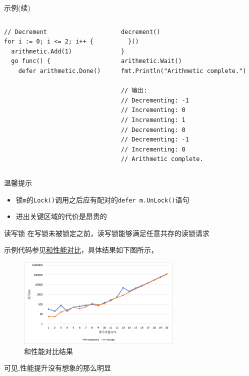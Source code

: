 \begin{frame}[fragile]{示例(续)}
    \begin{columns}[t]
        \begin{column}{0.5\textwidth}
\begin{lstlisting}[caption={\Mutex 使用示例(续)},firstnumber=last,xleftmargin=8pt]
// Decrement
for i := 0; i <= 2; i++ {
  arithmetic.Add(1)
  go func() {
    defer arithmetic.Done()
\end{lstlisting}
        \end{column}
        \begin{column}{0.5\textwidth}
\begin{lstlisting}[caption={\Mutex 使用示例(续)},firstnumber=last,xleftmargin=8pt]
    decrement()
  }()
}
arithmetic.Wait()
fmt.Println("Arithmetic complete.")

// 输出:
// Decrementing: -1
// Incrementing: 0
// Incrementing: 1
// Decrementing: 0
// Decrementing: -1
// Incrementing: 0
// Arithmetic complete.
\end{lstlisting}
        \end{column}
    \end{columns}
\end{frame}

\begin{frame}{温馨提示}
    \begin{itemize}
        \item 锁\texttt{m}的\texttt{Lock()}调用之后应有配对的\texttt{defer m.UnLock()}语句
        \item \alert{进出关键区域的代价是昂贵的}
    \end{itemize}    
\end{frame}
\fi

\begin{frame}{读写锁\RWMutex }
    \alert{在写锁未被锁定之前}，读写锁能够满足任意共存的读锁请求

    \bigskip
    示例代码参见\href{https://github.com/sammyne/concurrency-in-go/blob/master/chapter03/sync.pkg/mutex/rwlock.go}{\Mutex 和\RWMutex 性能对比}，具体结果如下图所示，

    \begin{figure}
        \centering
        \includegraphics[width=0.7\textwidth]{images/rwmutex-vs-mutex.png}
        \caption{\Mutex 和\RWMutex 性能对比结果}
    \end{figure}
    
    \alert{可见,性能提升没有想象的那么明显}
\end{frame}

